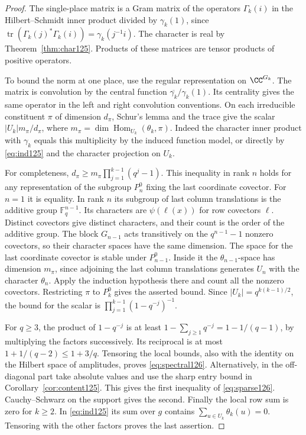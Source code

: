 \documentclass[a4paper,11pt]{article}
\theoremstyle{definition}
\theoremstyle{remark}
\numberwithin{equation}{section}
\begin{document}
\begin{proof}
The single-place matrix is a Gram matrix of the operators
\(\Gamma_k(i)\) in the Hilbert--Schmidt inner product divided by
\(\gamma_k(1)\), since
\(\operatorname{tr}(\Gamma_k(j)^*\Gamma_k(i))=\gamma_k(j^{-1}i)\).
The character is real by Theorem~\ref{thm:char125}. Products of
these matrices are tensor products of positive operators.

To bound the norm at one place, use the regular representation
on \(\CC^{G_k}\). The matrix is convolution by the central function
\(\overline{\gamma_k}/\gamma_k(1)\). Its centrality gives the same
operator in the left and right convolution conventions. On each irreducible
constituent \(\pi\) of dimension \(d_\pi\), Schur's lemma and
the trace give the scalar \(|U_k|m_\pi/d_\pi\), where
\(m_\pi=\dim\operatorname{Hom}_{U_k}(\theta_k,\pi)\).
Indeed the character inner product with \(\gamma_k\) equals this
multiplicity by the induced function model, or directly by
\eqref{eq:ind125} and the character projection on \(U_k\).

For completeness, \(d_\pi\ge m_\pi\prod_{j=1}^{k-1}(q^j-1)\).
This inequality in rank \(n\) holds for any representation of
the subgroup \(P_n^0\) fixing the last coordinate covector.
For \(n=1\) it is equality. In rank \(n\) its subgroup of last
column translations is the additive group \(\mathbb F_q^{n-1}\).
Its characters are \(\psi(\ell(x))\) for row covectors \(\ell\).
Distinct covectors give distinct characters, and their count is
the order of the additive group. The block \(G_{n-1}\) acts
transitively on the \(q^{n-1}-1\) nonzero covectors, so their
character spaces have the same dimension. The space for the last
coordinate covector is stable under \(P_{n-1}^0\). Inside it the
\(\theta_{n-1}\)-space has dimension \(m_\pi\), since adjoining
the last column translations generates \(U_n\) with the character
\(\theta_n\). Apply the induction hypothesis there and count all
the nonzero covectors. Restricting \(\pi\) to \(P_k^0\) gives the
asserted bound. Since \(|U_k|=q^{k(k-1)/2}\), the bound for the
scalar is \(\prod_{j=1}^{k-1}(1-q^{-j})^{-1}\).

For \(q\ge3\), the product of \(1-q^{-j}\) is at least
\(1-\sum_{j\ge1}q^{-j}=1-1/(q-1)\), by multiplying the factors
successively. Its reciprocal is at most \(1+1/(q-2)\le1+3/q\).
Tensoring the local bounds, also with the identity on the Hilbert
space of amplitudes, proves \eqref{eq:spectral126}. Alternatively,
in the off-diagonal part take absolute values and use the sharp
entry bound in Corollary~\ref{cor:content125}. This gives the first
inequality of \eqref{eq:sparse126}. Cauchy--Schwarz on the support
gives the second. Finally the local row sum is zero for \(k\ge2\).
In \eqref{eq:ind125} its sum over \(g\) contains
\(\sum_{u\in U_k}\theta_k(u)=0\). Tensoring with the other factors
proves the last assertion.
\end{proof}
\end{document}
